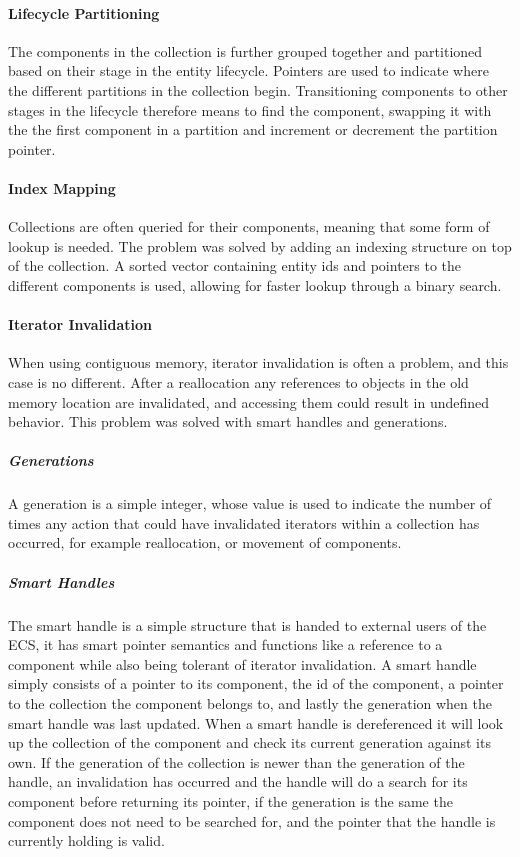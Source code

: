 \paragraph{Lifecycle Partitioning}
The components in the collection is further grouped together and partitioned based on their stage
in the entity lifecycle.
Pointers are used to indicate where the different partitions in the collection begin.
Transitioning components to other stages in the lifecycle therefore means to find the component,
swapping it with the the first component in a partition and increment or decrement the partition pointer.

\paragraph{Index Mapping}
Collections are often queried for their components, meaning that some form of lookup is needed.
The problem was solved by adding an indexing structure on top of the collection.
A sorted vector containing entity ids and pointers to the different components is used,
allowing for faster lookup through a binary search.

\paragraph{Iterator Invalidation}
When using contiguous memory, iterator invalidation is often a problem, and this case is no different.
After a reallocation any references to objects in the old memory location are invalidated,
and accessing them could result in undefined behavior.
This problem was solved with smart handles and generations.

\subparagraph{Generations}
A generation is a simple integer, whose value is used to indicate the number of times any action that
could have invalidated iterators within a collection has occurred, for example reallocation,
or movement of components.

\subparagraph{Smart Handles}
The smart handle is a simple structure that is handed to external users of the ECS,
it has smart pointer semantics and functions like a reference to a component while also being tolerant of iterator invalidation.
A smart handle simply consists of a pointer to its component, the id of the component,
a pointer to the collection the component belongs to, and lastly the generation when the smart handle was last updated.
When a smart handle is dereferenced it will look up the collection of the component and check its current generation
against its own. If the generation of the collection is newer than the generation of the handle,
an invalidation has occurred and the handle will do a search for its component before returning its pointer,
if the generation is the same the component does not need to be searched for, and the pointer that the handle is currently holding is valid.

